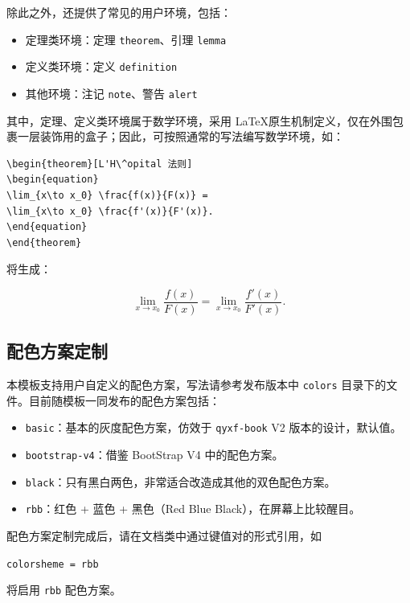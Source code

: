 \documentclass[
  10pt,
  twoside,
  openany,
  b5paper, %
  colorscheme = basic %
]{qyxf-book}
\begin{document}
除此之外，还提供了常见的用户环境，包括：
\begin{itemize}
  \item 定理类环境：定理 \verb|theorem|、引理 \verb|lemma|
  \item 定义类环境：定义 \verb|definition|
  \item 其他环境：注记 \verb|note|、警告 \verb|alert|
\end{itemize}
其中，定理、定义类环境属于数学环境，采用 \LaTeX 原生机制定义，仅在外围包裹一层装饰用的盒子；因此，可按照通常的写法编写数学环境，如：
\begin{tcolorbox}
  \begin{verbatim}
\begin{theorem}[L'H\^opital 法则]
\begin{equation}
\lim_{x\to x_0} \frac{f(x)}{F(x)} =
\lim_{x\to x_0} \frac{f'(x)}{F'(x)}.
\end{equation}
\end{theorem}
\end{verbatim}
\end{tcolorbox}
将生成：
\begin{theorem}[L'H\^opital 法则]
\begin{equation}
\lim_{x\to x_0} \frac{f(x)}{F(x)} =
\lim_{x\to x_0} \frac{f'(x)}{F'(x)}.
\end{equation}
\end{theorem}

\subsection{配色方案定制}

本模板支持用户自定义的配色方案，写法请参考发布版本中 \verb|colors| 目录下的文件。目前随模板一同发布的配色方案包括：
\begin{itemize}
  \item \verb|basic|：基本的灰度配色方案，仿效于 \verb|qyxf-book| V2 版本的设计，默认值。
  \item \verb|bootstrap-v4|：借鉴 BootStrap V4 中的配色方案。
  \item \verb|black|：只有黑白两色，非常适合改造成其他的双色配色方案。
  \item \verb|rbb|：红色 + 蓝色 + 黑色（Red Blue Black），在屏幕上比较醒目。
\end{itemize}

配色方案定制完成后，请在文档类中通过键值对的形式引用，如
\begin{tcolorbox}
\verb|colorsheme = rbb| 
\end{tcolorbox}
将启用 \verb|rbb| 配色方案。
\end{document}
